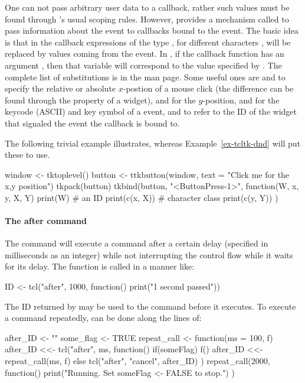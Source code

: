 One can not pass arbitrary user data to a callback, rather such values
must be found through \R's usual scoping rules. However, \TK\/
provides a mechanism called  to pass
information about the event to callbacks bound to the event. The basic
idea is that in the \TCL\/ callback expressions of the type
, for different characters , will be replaced by values
coming from the event. In , if the callback function has an
argument , then that variable will correspond to the value
specified by . The complete list of substitutions is in the
 man page. Some useful ones are  and  to
specify the relative or absolute $x$-postion of a mouse click (the
difference can be found through the  property of a
widget),  and  for the $y$-position,  and
 for the keycode (ASCII) and key symbol of a
 event, and  to refer to the ID of the
widget that signaled the event the callback is bound
to. 

The following trivial example illustrates, whereas
Example~\ref{ex-tcltk-dnd} will put these to use.

\begin{Schunk}
\begin{Sinput}
 window <- tktoplevel()
 button <- 
   ttkbutton(window, text = "Click me for the x,y position")
 tkpack(button)
 tkbind(button, "<ButtonPress-1>", function(W, x, y, X, Y) {
   print(W)                              # an ID
   print(c(x, X))                        # character class
   print(c(y, Y))
   })
\end{Sinput}
\end{Schunk}




\paragraph{The after command}
The \TCL\/ command  will execute a command after a certain
delay (specified in milliseconds as an integer) while not interrupting
the control flow while it waits for its delay. The function is called
in a manner like:
\begin{Schunk}
  \begin{Sinput}
ID <- tcl("after", 1000, function() print("1 second passed"))    
  \end{Sinput}
\end{Schunk}
The ID returned by  may be used to  the
command before it executes. To execute a command repeatedly, can be
done along the lines of:
\begin{Schunk}
\begin{Sinput}
 after_ID <- ""
 some_flag <- TRUE
 repeat_call <- function(ms = 100, f) {
   after_ID <<- tcl("after", ms, function() {
     if(someFlag) {                      
       f()
       after_ID <<- repeat_call(ms, f)
     }  else {
       tcl("after", "cancel", after_ID)
     }
   })
 }
 repeat_call(2000, function() {
   print("Running. Set someFlag <- FALSE to stop.")
 })
\end{Sinput}
\end{Schunk}
%


